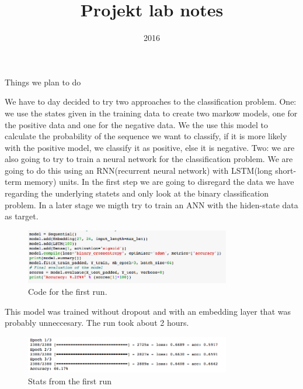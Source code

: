 \documentclass[a4paper]{tufte-handout}
\title{Projekt lab notes}
\date{2016}
\begin{document}
\maketitle


\begin{projects}
	\begin{description}
		\item Things we plan to do 
	\end{description}
\end{projects}


We have to day decided to try two approaches to the classification problem.
One: we use the states given in the training data to create two markow models,
one for the positive data and one for the negative data. We the use this model
to calculate the probability of the sequence we want to classify, if it is more
likely with the positive model, we classify it as positive, else it is
negative. Two: we are also going to try to train a neural network for the
classification problem. We are going to do this using an RNN(recurrent neural
network) with LSTM(long short-term memory) units. In the first step we are
going to disregard the data we have regarding the underlying statets and only
look at the binary classification problem. In a later stage we migth try to
train an ANN with the hiden-state data as target.


\begin{figure}
    \begin{center}
      \includegraphics[width=0.8\textwidth]{pics/code_run_1.png}
    \end{center}
    \caption{Code for the first run.}
\end{figure}

This model was trained without dropout and with an embedding layer that was probably unneccesary.
The run took about 2 hours.

\begin{figure}
    \begin{center}
      \includegraphics[width=0.8\textwidth]{pics/first_run.png}
    \end{center}
    \caption{Stats from the first run}
\end{figure}
\end{document}
